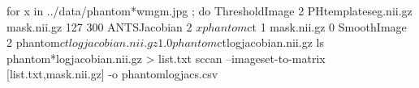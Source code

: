   for x in ../data/phantom*wmgm.jpg ; do 
    ThresholdImage 2 PHtemplateseg.nii.gz  mask.nii.gz 127 300  
      ANTSJacobian 2 $x phantom${ct} 1 mask.nii.gz 0  
      SmoothImage 2 phantom${ct}logjacobian.nii.gz 1.0  phantom${ct}logjacobian.nii.gz 
    ls phantom*logjacobian.nii.gz > list.txt   
    sccan --imageset-to-matrix [list.txt,mask.nii.gz] -o phantomlogjacs.csv   
